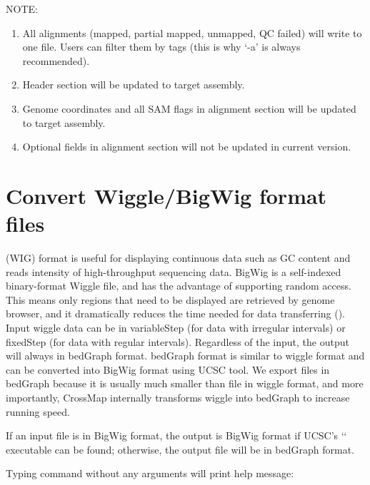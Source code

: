 \documentclass[letterpaper,10pt,english]{sphinxmanual}
\begin{document}
NOTE:
\begin{enumerate}
\item {} 
All alignments (mapped, partial mapped, unmapped, QC failed) will write to one file. Users can filter them by tags (this is why `-a' is always recommended).

\item {} 
Header section will be updated to target assembly.

\item {} 
Genome coordinates and all SAM flags in alignment section will be updated to target assembly.

\item {} 
Optional fields in alignment section will not be updated in current version.

\end{enumerate}


\section{Convert Wiggle/BigWig format files}
\label{\detokenize{index:convert-wiggle-bigwig-format-files}}
 (WIG) format is useful for
displaying continuous data such as GC content and reads intensity of high-throughput sequencing data.
BigWig is a self-indexed binary-format Wiggle file, and has the advantage of supporting random access.
This means only regions that need to be displayed are retrieved by genome browser, and it dramatically
reduces the time needed for data transferring ().
Input wiggle data can be in variableStep (for data with irregular intervals) or fixedStep
(for data with regular intervals). Regardless of the input, the output will always in bedGraph
format. bedGraph format is similar to wiggle format and can be converted into BigWig format
using UCSC  tool. We export files
in bedGraph because it is usually much smaller than file in wiggle format, and more importantly,
CrossMap internally transforms wiggle into bedGraph to increase running speed.

If an input file is in BigWig format, the output is BigWig format if UCSC’s
`` executable can be found;
otherwise, the output file will be in bedGraph format.

Typing command without any arguments will print help message:
\end{document}
